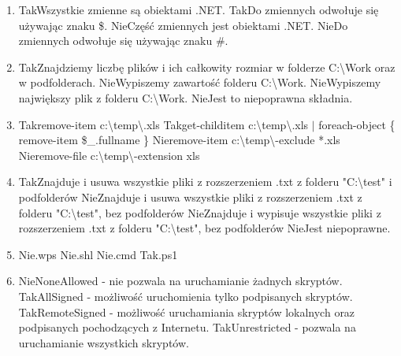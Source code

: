 \begin{enumerate}
		\newpage
		\item {}%
		{Tak}{Wszystkie zmienne są obiektami .NET.}%
		{Tak}{Do zmiennych odwołuje się używając znaku \$.}%
		{Nie}{Część zmiennych jest obiektami .NET.}%
		{Nie}{Do zmiennych odwołuje się używając znaku \#.}
		\item {}%
		{Tak}{Znajdziemy liczbę plików i ich całkowity rozmiar w folderze C:\textbackslash Work oraz w podfolderach.}%
		{Nie}{Wypiszemy zawartość folderu C:\textbackslash Work.}%
		{Nie}{Wypiszemy największy plik z folderu C:\textbackslash Work.}%
		{Nie}{Jest to niepoprawna składnia.}
		\item {}%
		{Tak}{remove-item c:\textbackslash temp\textbackslash *.xls}%
		{Tak}{get-childitem c:\textbackslash temp\textbackslash *.xls $ \mid $ foreach-object \{ remove-item \$\_.fullname \}}%
		{Nie}{remove-item c:\textbackslash temp\textbackslash * -exclude *.xls}%
		{Nie}{remove-file c:\textbackslash temp\textbackslash * -extension xls}
		\item {}%
		{Tak}{Znajduje i usuwa wszystkie pliki z rozszerzeniem .txt z folderu "C:\textbackslash test" i podfolderów}%
		{Nie}{Znajduje i usuwa wszystkie pliki z rozszerzeniem .txt z folderu "C:\textbackslash test", bez podfolderów}%
		{Nie}{Znajduje i wypisuje wszystkie pliki z rozszerzeniem .txt z folderu "C:\textbackslash test", bez podfolderów}%
		{Nie}{Jest niepoprawne.}
		\item {}%
		{Nie}{.wps}%
		{Nie}{.shl}%
		{Nie}{.cmd}%
		{Tak}{.ps1}
		\item {}%
		{Nie}{NoneAllowed - nie pozwala na uruchamianie żadnych skryptów.}%
		{Tak}{AllSigned - możliwość uruchomienia tylko podpisanych skryptów.}%
		{Tak}{RemoteSigned - możliwość uruchamiania skryptów lokalnych oraz podpisanych pochodzących z Internetu.}%
		{Tak}{Unrestricted - pozwala na uruchamianie wszystkich skryptów.}
		

\end{enumerate}
